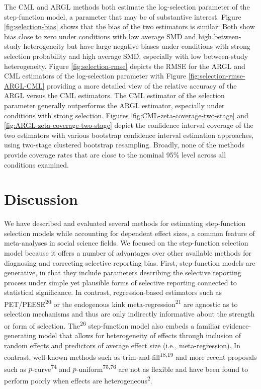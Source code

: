 \documentclass[
  american,
  man, donotrepeattitle,floatsintext]{apa7}
\begin{document}
The CML and ARGL methods both estimate the log-selection parameter of the step-function model, a parameter that may be of substantive interest.
Figure \ref{fig:selection-bias} shows that the bias of the two estimators is similar: Both show bias close to zero under conditions with low average SMD and high between-study heterogeneity but have large negative biases under conditions with strong selection probability and high average SMD, especially with low between-study heterogeneity.
Figure \ref{fig:selection-rmse} depicts the RMSE for the ARGL and CML estimators of the log-selection parameter with Figure \ref{fig:selection-rmse-ARGL-CML} providing a more detailed view of the relative accuracy of the ARGL versus the CML estimators.
The CML estimator of the selection parameter generally outperforms the ARGL estimator, especially under conditions with strong selection.
Figures \ref{fig:CML-zeta-coverage-two-stage} and \ref{fig:ARGL-zeta-coverage-two-stage} depict the confidence interval coverage of the two estimators with various bootstrap confidence interval estimation approaches, using two-stage clustered bootstrap resampling.
Broadly, none of the methods provide coverage rates that are close to the nominal 95\% level across all conditions examined.

\section{Discussion}\label{discussion}

We have described and evaluated several methods for estimating step-function selection models while accounting for dependent effect sizes, a common feature of meta-analyses in social science fields.
We focused on the step-function selection model because it offers a number of advantages over other available methods for diagnosing and correcting selective reporting bias.
First, step-function models are generative, in that they include parameters describing the selective reporting process under simple yet plausible forms of selective reporting connected to statistical significance.
In contrast, regression-based estimators such as PET/PEESE\textsuperscript{20} or the endogenous kink meta-regression\textsuperscript{21} are agnostic as to selection mechanisms and thus are only indirectly informative about the strength or form of selection.
The\textsuperscript{26} step-function model also embeds a familiar evidence-generating model that allows for heterogeneity of effects through inclusion of random effects and predictors of average effect size (i.e., meta-regression).
In contrast, well-known methods such as trim-and-fill\textsuperscript{18,19} and more recent proposals such as \(p\)-curve\textsuperscript{74} and \(p\)-uniform\textsuperscript{75,76} are not as flexible and have been found to perform poorly when effects are heterogeneous\textsuperscript{2}.
\end{document}
